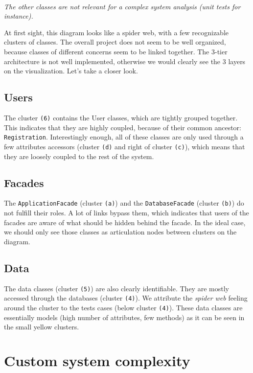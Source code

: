 \paragraph*{}\textit{The other classes are not relevant for a complex system analysis (unit tests for instance).}

At first sight, this diagram looks like a spider web, with a few recognizable clusters of classes. The overall project does not seem to be well organized, because classes of different concerns seem to be linked together. The 3-tier architecture is not well implemented, otherwise we would clearly see the 3 layers on the visualization. Let's take a closer look.

\subsection{Users}
The cluster \texttt{(6)} contains the User classes, which are tightly grouped together. This indicates that they are highly coupled, because of their common ancestor: \texttt{Registration}. Interestingly enough, all of these classes are only used through a few attributes accessors (cluster \texttt{(d)} and right of cluster \texttt{(c)}), which means that they are loosely coupled to the rest of the system.

\subsection{Facades}
The \texttt{ApplicationFacade} (cluster \texttt{(a)}) and the \texttt{DatabaseFacade} (cluster \texttt{(b)}) do not fulfill their roles. A lot of links bypass them, which indicates that users of the facades are aware of what should be hidden behind the facade. In the ideal case, we should only see those classes as articulation nodes between clusters on the diagram.

\subsection{Data}
The data classes (cluster \texttt{(5)}) are also clearly identifiable. They are mostly accessed through the databases (cluster \texttt{(4)}). We attribute the \textit{spider web} feeling around the cluster to the tests cases (below cluster \texttt{(4)}). These data classes are essentially models (high number of attributes, few methods) as it can be seen in the small yellow clusters.

\section{Custom system complexity}
